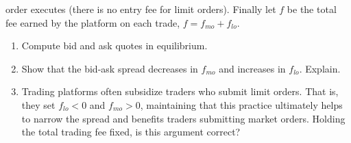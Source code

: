 \documentclass[a4paper]{article}
\begin{document}
\begin{enumerate}
      order executes (there is no entry fee for limit orders). Finally let $f$ be the total fee
      earned by the platform on each trade, $f = f_{mo} + f_{lo}$.
      \begin{enumerate}
        \item Compute bid and ask quotes in equilibrium.
        \item Show that the bid-ask spread decreases in $f_{mo}$ and increases in $f_{lo}$. Explain.
        \item Trading platforms often subsidize traders who submit limit orders. That is, they set $f_{lo} < 0$ and $f_{mo} > 0$, maintaining 
          that this practice ultimately helps to narrow the spread and benefits traders submitting market orders. Holding the total
          trading fee fixed, is this argument correct?
      \end{enumerate}
\end{enumerate}
\end{document}
